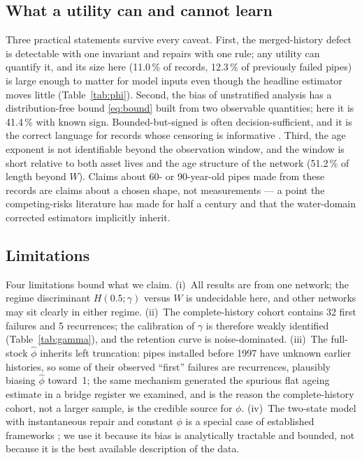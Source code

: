 \documentclass[review,12pt,authoryear]{elsarticle}
\begin{document}
\subsection{What a utility can and cannot learn}
Three practical statements survive every caveat. First, the merged-history
defect is detectable with one invariant and repairs with one rule; any
utility can quantify it, and its size here (11.0\,\% of records,
12.3\,\% of previously failed pipes) is large enough to matter for
model inputs even though the headline estimator moves little
(Table~\ref{tab:phi}). Second, the bias of unstratified analysis has a
distribution-free bound \eqref{eq:bound} built from two observable
quantities; here it is 41.4\,\% with known sign. Bounded-but-signed is
often decision-sufficient, and it is the correct language for records whose
censoring is informative \citep{Manski2003,Bartlett2014}. Third, the age
exponent is not identifiable beyond the observation window, and the window
is short relative to both asset lives and the age structure of the network
(51.2\,\% of length beyond $W$). Claims about 60- or 90-year-old pipes
made from these records are claims about a chosen shape, not measurements
--- a point the competing-risks literature has made for half a century
\citep{Tsiatis1975,Crowder1994} and that the water-domain corrected
estimators \citep{Scheidegger2013,LeGat2013} implicitly inherit.

\subsection{Limitations}
Four limitations bound what we claim. (i)~All results are from one network;
the regime discriminant $H(0.5;\gamma)$ versus $W$ is undecidable here, and
other networks may sit clearly in either regime. (ii)~The complete-history
cohort contains 32 first failures and 5 recurrences; the
calibration of $\gamma$ is therefore weakly identified
(Table~\ref{tab:gamma}), and the retention curve is noise-dominated.
(iii)~The full-stock $\hat\phi$ inherits left truncation: pipes installed
before 1997 have unknown earlier histories, so some of their observed
``first'' failures are recurrences, plausibly biasing $\hat\phi$ toward~1;
the same mechanism generated the spurious flat ageing estimate in a bridge
register we examined, and is the reason the complete-history cohort, not a
larger sample, is the credible source for $\phi$. (iv)~The two-state model
with instantaneous repair and constant $\phi$ is a special case of
established frameworks \citep{LeGat2013,Scheidegger2013}; we use it because
its bias is analytically tractable and bounded, not because it is the best
available description of the data.
\end{document}
